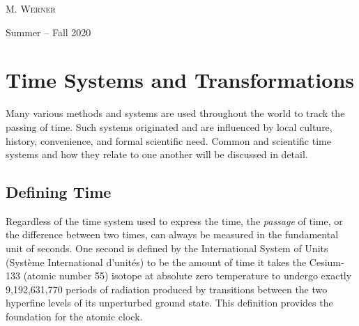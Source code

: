 \documentclass[11pt,dvipsnames]{thesis}
\begin{document}
\begin{titlepage}
	M. \textsc{Werner} %
	
	\vfill\vfill

	\vfill
	{\large Summer -- Fall 2020} %
	

	
	 
	
\end{titlepage}

\tableofcontents
\chapter{Time Systems and Transformations}
Many various methods and systems are used throughout the world to track the passing of time. Such systems originated and are influenced by local culture, history, convenience, and formal scientific need. Common and scientific time systems and how they relate to one another will be discussed in detail.

\section{Defining Time}
Regardless of the time system used to express the time, the \textit{passage} of time, or the difference between two times, can always be measured in the fundamental unit of seconds. One second is defined by the International System of Units (Syst\`eme International d'unit\'es) to be the amount of time it takes the Cesium-133 (atomic number 55) isotope at absolute zero temperature to undergo exactly 9,192,631,770 periods of radiation produced by transitions between the two hyperfine levels of its unperturbed ground state. This definition provides the foundation for the atomic clock.
\end{document}
